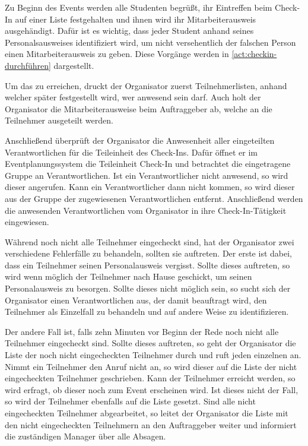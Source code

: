 Zu Beginn des Events werden alle Studenten begrüßt, ihr Eintreffen beim Check-In auf einer Liste festgehalten und ihnen wird ihr Mitarbeiterausweis ausgehändigt. Dafür ist es wichtig, dass jeder Student anhand seines Personalsausweises identifiziert wird, um nicht versehentlich der falschen Person einen Mitarbeiterausweis zu geben. Diese Vorgänge werden in \autoref{act:checkin-durchführen} dargestellt.

Um das zu erreichen, druckt der Organisator zuerst Teilnehmerlisten, anhand welcher später festgestellt wird, wer anwesend sein darf. Auch holt der Organisator die Mitarbeiterausweise beim Auftraggeber ab, welche an die Teilnehmer ausgeteilt werden.

Anschließend überprüft der Organisator die Anwesenheit aller eingeteilten Verantwortlichen für die Teileinheit des Check-Ins. Dafür öffnet er im Eventplanungssystem die Teileinheit Check-In und betrachtet die eingetragene Gruppe an Verantwortlichen. Ist ein Verantwortlicher nicht anwesend, so wird dieser angerufen. Kann ein Verantwortlicher dann nicht kommen, so wird dieser aus der Gruppe der zugewiesenen Verantwortlichen entfernt. Anschließend werden die anwesenden Verantwortlichen vom Organisator in ihre Check-In-Tätigkeit eingewiesen.

Während noch nicht alle Teilnehmer eingecheckt sind, hat der Organisator zwei verschiedene Fehlerfälle zu behandeln, sollten sie auftreten. Der erste ist dabei, dass ein Teilnehmer seinen Personalausweis vergisst. Sollte dieses auftreten, so wird wenn möglich der Teilnehmer nach Hause geschickt, um seinen Personalausweis zu besorgen. Sollte dieses nicht möglich sein, so sucht sich der Organisator einen Verantwortlichen aus, der damit beauftragt wird, den Teilnehmer als Einzelfall zu behandeln und auf andere Weise zu identifizieren.

Der andere Fall ist, falls zehn Minuten vor Beginn der Rede noch nicht alle Teilnehmer eingecheckt sind. Sollte dieses auftreten, so geht der Organisator die Liste der noch nicht eingecheckten Teilnehmer durch und ruft jeden einzelnen an. Nimmt ein Teilnehmer den Anruf nicht an, so wird dieser auf die Liste der nicht eingecheckten Teilnehmer geschrieben. Kann der Teilnehmer erreicht werden, so wird erfragt, ob dieser noch zum Event erscheinen wird. Ist dieses nicht der Fall, so wird der Teilnehmer ebenfalls auf die Liste gesetzt. Sind alle nicht eingecheckten Teilnehmer abgearbeitet, so leitet der Organisator die Liste mit den nicht eingecheckten Teilnehmern an den Auftraggeber weiter und informiert die zuständigen Manager über alle Absagen.

